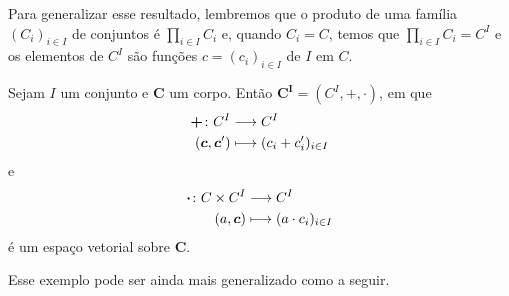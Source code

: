 Para generalizar esse resultado, lembremos que o produto de uma família $(C_i)_{i \in I}$ de conjuntos é $\prod_{i \in I} C_i$ e, quando $C_i=C$, temos que $\prod_{i \in I} C_i = C^I$ e os elementos de $C^I$ são funções $c=(c_i)_{i \in I}$ de $I$ em $C$.

\begin{proposition}
Sejam $I$ um conjunto e $\bm C$ um corpo. Então $\bm {C^I}=(C^I,\bm +,\bm\cdot)$, em que
	\begin{align*}
	{\bm +}\colon {C^I} &\longrightarrow {C^I} \\{(\bm c,\bm c')} &\longmapsto (c_i+c'_i)_{i \in I}
	\end{align*}
e
	\begin{align*}
	{\bm\cdot}\colon {C \times C^I} &\longrightarrow {C^I} \\{(a,\bm c)} &\longmapsto (a \cdot c_i)_{i \in I}
	\end{align*}
é um espaço vetorial sobre $\bm C$.
\end{proposition}

Esse exemplo pode ser ainda mais generalizado como a seguir.

